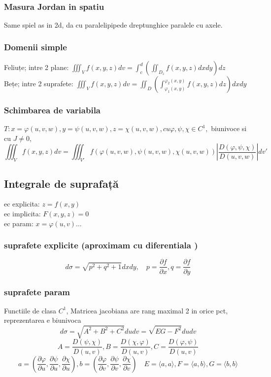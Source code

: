 \documentclass{article}
\newcommand{\parti}[2]{\frac{\partial #1}{ \partial #2}}
\begin{document}
\subsubsection*{Masura Jordan in spatiu}
Same spiel as in 2d, da cu paralelipipede dreptunghice paralele cu axele.
\subsubsection*{Domenii simple}
Feliuțe; intre 2 plane: $\displaystyle \iiint_V f(x, y, z) dv = \int_c^d \left( \iint_{D_z} f(x, y,z) dx dy \right) dz$\\
Bețe; intre 2 suprafete: $\displaystyle \iiint_V f(x, y, z) dv = \iint_D \left( \int_{\varphi_1(x,y)}^{\varphi_2(x,y)} f(x, y,z) dz \right) dx dy$\\
\subsubsection*{Schimbarea de variabila}
$T: x= \varphi(u, v, w), y= \psi(u, v, w), z= \chi(u, v, w), cu \varphi, \psi, \chi \in C^1,$ biunivoce si cu $J \neq 0 $,
\[ \iiint_V f(x, y, z) dv = \iiint_{V'} f(\varphi(u, v, w), \psi(u, v, w), \chi(u, v, w)) \left|\frac{D(\varphi, \psi, \chi)}{D(u,v,w)}\right| dv' \]
\subsection*{Integrale de suprafață}
ec explicita: $z= f(x, y)$\\
ec implicita: $F(x,y,z)=0$\\
ec param: $x = \varphi(u,v)\ldots$\\
\subsubsection*{suprafete explicite (aproximam cu diferentiala )}
\[d\sigma = \sqrt{p^2+q^2+1}dx dy, \quad p = \parti f x, q = \parti f y\]
\subsubsection*{suprafete param}
Functiile de clasa $C^1$, Matricea jacobiana are rang maximal 2 in orice pct, reprezentarea e biunivoca\\
\[d\sigma = \sqrt{A^2+B^2+C^2}du dv = \sqrt{EG-F^2}du dv\]
\[A = \frac{D(\psi, \chi)}{D(u, v)}, B = \frac{D(\chi, \varphi)}{D(u, v)}, C = \frac{D(\varphi, \psi)}{D(u, v)} \]
\[ a = \left( \parti{\varphi}{u}, \parti{\psi}{u}, \parti{\chi}{u} \right),
  b = \left( \parti{\varphi}{v}, \parti{\psi}{v}, \parti{\chi}{v} \right)\quad
  E = \langle a, a \rangle,
  F =\langle a, b \rangle,
  G =\langle b, b \rangle
\]
\end{document}

